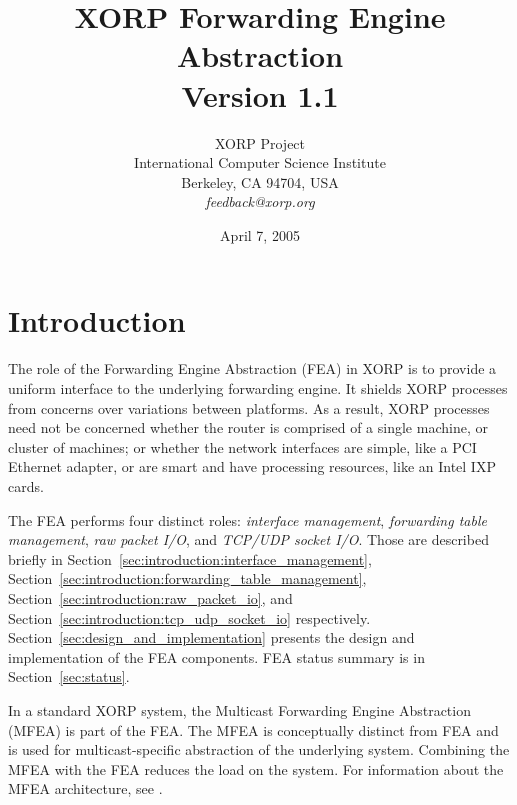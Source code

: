 \documentclass[11pt]{article}
\begin{document}
\title{XORP Forwarding Engine Abstraction \\
\vspace{1ex}
Version 1.1}
\author{ XORP Project					\\
	 International Computer Science Institute	\\
	 Berkeley, CA 94704, USA			\\
	 {\it feedback@xorp.org}
}
\date{April 7, 2005}

\maketitle

\thispagestyle{empty}


\section{Introduction}
\label{sec:introduction}

The role of the Forwarding Engine Abstraction (FEA) in XORP is to
provide a uniform interface to the underlying forwarding engine.  It
shields XORP processes from concerns over variations between
platforms.  As a result, XORP processes need not be concerned whether
the router is comprised of a single machine, or cluster of machines;
or whether the network interfaces are simple, like a PCI Ethernet
adapter, or are smart and have processing resources, like an Intel IXP
cards.

The FEA performs four distinct roles: \emph{interface management},
\emph{forwarding table management}, \emph{raw packet I/O},
and \emph{TCP/UDP socket I/O}.  Those are
described briefly in
Section~\ref{sec:introduction:interface_management},
Section~\ref{sec:introduction:forwarding_table_management},
Section~\ref{sec:introduction:raw_packet_io},
and Section~\ref{sec:introduction:tcp_udp_socket_io}
respectively.
Section~\ref{sec:design_and_implementation} presents
the design and implementation of the FEA components.
FEA status summary is in Section~\ref{sec:status}.

In a standard XORP system, the Multicast Forwarding Engine Abstraction
(MFEA) is part of the FEA.  The MFEA is conceptually distinct from
FEA and is used for multicast-specific abstraction of the underlying system.
Combining the MFEA with the FEA reduces the load on the system.  For
information about the MFEA architecture, see \cite{xorp:mfea}.

\end{document}
